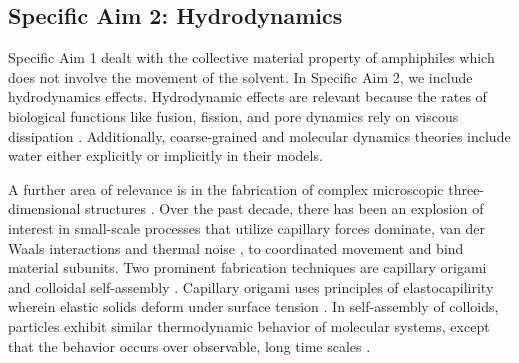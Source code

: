 \subsection{Specific Aim 2: Hydrodynamics}
\label{subsec:specific_aim_2}
Specific Aim 1 dealt with the collective material property of amphiphiles which does not involve the movement  of the solvent.
In Specific Aim 2, we include hydrodynamics effects. Hydrodynamic effects are relevant
because the rates of biological functions like fusion, fission, and pore dynamics rely on viscous dissipation \cite{RYHAM20112929}. 
Additionally, coarse-grained and molecular dynamics theories include water either explicitly or implicitly in their models. 

A further area of relevance is in the fabrication of complex microscopic three-dimensional structures \cite{Cho2010}.
Over the past decade, there has been an explosion of interest in small-scale processes that utilize capillary forces dominate,  van der Waals interactions and thermal noise  \cite{Zhang2017},
to coordinated movement and bind  material subunits. Two prominent fabrication techniques are capillary origami 
\cite{Pandey2011,Leong2007,Reynolds2019} and colloidal self-assembly \cite{Dasgupta2017,Siontorou2017}. Capillary origami uses principles of elastocapilirity wherein elastic solids deform under surface tension \cite{Bico2018,VanHonschoten2010}. In self-assembly of colloids, 
particles exhibit similar thermodynamic behavior of molecular systems, except that the behavior occurs over observable, long time scales \cite{Zhang2017}. 


